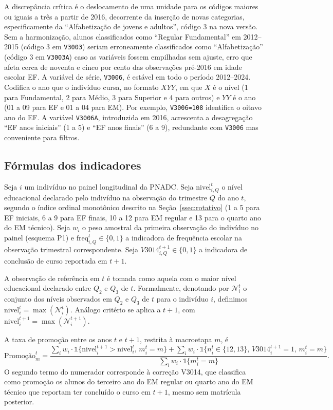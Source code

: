 A discrepância crítica é o deslocamento de uma unidade para os códigos
maiores ou iguais a três a partir de 2016, decorrente da inserção de
novas categorias, especificamente da ``Alfabetização de jovens e
adultos'', código 3 na nova versão. Sem a harmonização, alunos
classificados como ``Regular Fundamental'' em 2012--2015 (código 3
em \texttt{V3003}) seriam erroneamente classificados como
``Alfabetização'' (código 3 em \texttt{V3003A}) caso as variáveis
fossem empilhadas sem ajuste, erro que afeta cerca de noventa e cinco
por cento das observações pré-2016 em idade escolar EF. A variável de
série, \texttt{V3006}, é estável em todo o período 2012--2024.
Codifica o ano que o indivíduo cursa, no formato $XYY$, em que $X$ é
o nível (1 para Fundamental, 2 para Médio, 3 para Superior e 4 para
outros) e $YY$ é o ano (01 a 09 para EF e 01 a 04 para EM). Por
exemplo, \texttt{V3006=108} identifica o oitavo ano do EF. A
variável \texttt{V3006A}, introduzida em 2016, acrescenta a
desagregação ``EF anos iniciais'' (1 a 5) e ``EF anos finais'' (6 a
9), redundante com \texttt{V3006} mas conveniente para filtros.

\subsection*{Fórmulas dos indicadores}

Seja $i$ um indivíduo no painel longitudinal da PNADC. Seja
$\text{nivel}_{i,Q}^{t}$ o nível educacional declarado pelo
indivíduo na observação do trimestre $Q$ do ano $t$, segundo o
índice ordinal monotônico descrito na
Seção~\ref{ssec:rotativo} (1 a 5 para EF iniciais, 6 a 9 para EF
finais, 10 a 12 para EM regular e 13 para o quarto ano do EM
técnico). Seja $w_i$ o peso amostral da primeira observação do
indivíduo no painel (esquema P1) e
$\text{freq}_{i,Q}^{t} \in \{0,1\}$ a indicadora de frequência
escolar na observação trimestral correspondente. Seja
$V3014_{i,Q}^{t+1} \in \{0,1\}$ a indicadora de conclusão de
curso reportada em $t+1$.

A observação de referência em $t$ é tomada como aquela com o maior
nível educacional declarado entre $Q_2$ e $Q_3$ de $t$. Formalmente,
denotando por $\mathcal{N}_i^t$ o conjunto dos níveis observados
em $Q_2$ e $Q_3$ de $t$ para o indivíduo $i$, definimos
$\text{nivel}_i^t = \max(\mathcal{N}_i^t)$. Análogo critério se
aplica a $t+1$, com $\text{nivel}_i^{t+1} = \max(\mathcal{N}_i^{t+1})$.

A taxa de promoção entre os anos $t$ e $t+1$, restrita à macroetapa
$m$, é
\[
\text{Promoção}_m^t = \frac{\sum_i w_i \cdot \mathbb{1}\{\text{nivel}_i^{t+1} > \text{nivel}_i^t,\, m_i^t = m\}
+ \sum_i w_i \cdot \mathbb{1}\{n_i^t \in \{12, 13\},\, V3014_i^{t+1} = 1,\, m_i^t = m\}}
{\sum_i w_i \cdot \mathbb{1}\{m_i^t = m\}}.
\]
O segundo termo do numerador corresponde à correção V3014, que
classifica como promoção os alunos do terceiro ano do EM regular
ou quarto ano do EM técnico que reportam ter concluído o curso
em $t+1$, mesmo sem matrícula posterior.

